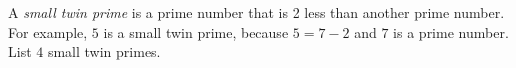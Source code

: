 \documentclass[12pt]{exam}
\begin{document}
\begin{questions}

	\question[2] 
	A \emph{small twin prime} is a prime number that is 2 less than another prime number. For example, $5$ is a small twin prime, because $5 = 7 - 2$ and $7$ is a prime number. List $4$ small twin primes. \\

\clearpage
	


\end{questions}
\end{document}
